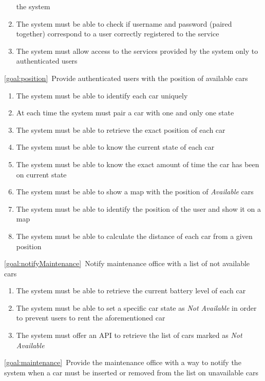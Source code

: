 \begin{description}
\begin{enumerate}[resume*]
  				the system
   				\item The system must be able to check if username and password (paired together)
   				correspond to a user correctly registered to the service
   				\item The system must allow access to the services provided by the system only to
   				authenticated users 
			\end{enumerate}
		\item \ref{goal:position}\ Provide authenticated users with the position of available cars
			\begin{enumerate}[resume*]
				\item The system must be able to identify each car uniquely
			 	\item At each time the system must pair a car with one and only one state
  				\item The system must be able to retrieve the exact position of each car
   				\item The system must be able to know the current state of each car
   				\item The system must be able to know the exact amount of time the car has been on
   				current state
   				\item The system must be able to show a map with the position of \textit{Available} cars
  				\item The system must be able to identify the position of the user and show it on a map
   				\item The system must be able to calculate the distance of each car from a given position
  			\end{enumerate}
		\item \ref{goal:notifyMaintenance}\ Notify maintenance office with a list of not available cars
			\begin{enumerate}[resume*]
   				\item The system must be able to retrieve the current battery level of each car
   				\item The system must be able to set a specific car state as \textit{Not Available} in order
   				to prevent users to rent the aforementioned car
   				\item The system must offer an API to retrieve the list of cars marked as \textit{Not
   				Available}
  			\end{enumerate}
		\item \ref{goal:maintenance}\ Provide the maintenance office with a way to notify the system
		when a car must be inserted or removed from the list on unavailable cars

\end{description}
